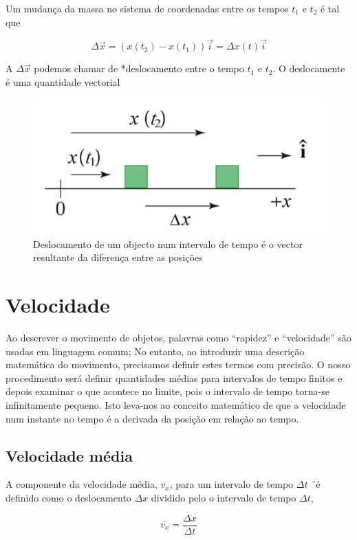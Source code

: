 \documentclass[
  portuguese,
  ]{book}
\begin{document}
Um mudança da massa no sistema de coordenadas entre os tempos \(t_1\) e \(t_2\) é tal que

\[\Delta\vec{x}=(x(t_2)-x(t_1))\vec{i}=\Delta x(t)\vec{i}\]

A \(\Delta \vec{x}\) podemos chamar de *deslocamento entre o tempo \(t_1\) e \(t_2\). O deslocamente é uma quantidade vectorial

\begin{figure}

{\centering \includegraphics[width=0.4\linewidth]{img/3} 

}

\caption{Deslocamento de um objecto num intervalo de tempo é o vector resultante da diferença entre as posições}\label{fig:img3}
\end{figure}

\hypertarget{velocidade}{%
\section{Velocidade}\label{velocidade}}

Ao descrever o movimento de objetos, palavras como ``rapidez'' e ``velocidade'' são usadas em linguagem comum; No entanto, ao introduzir uma descrição matemática do movimento, precisamos definir estes termos com precisão. O nosso procedimento será definir quantidades médias para intervalos de tempo finitos e depois examinar o que acontece no limite, pois o intervalo de tempo torna-se infinitamente pequeno. Isto leva-nos ao conceito matemático de que a velocidade num instante no tempo é a derivada da posição em relação ao tempo.

\hypertarget{velocidade-muxe9dia}{%
\subsection{Velocidade média}\label{velocidade-muxe9dia}}

A componente da velocidade média, \(\overline{v_x}\), para um intervalo de tempo \(\Delta t\) ´é definido como o deslocamento \(\Delta x\) dividido pelo o intervalo de tempo \(\Delta t\),

\[\overline{v_x}=\frac{\Delta x}{\Delta t}\]
\end{document}
